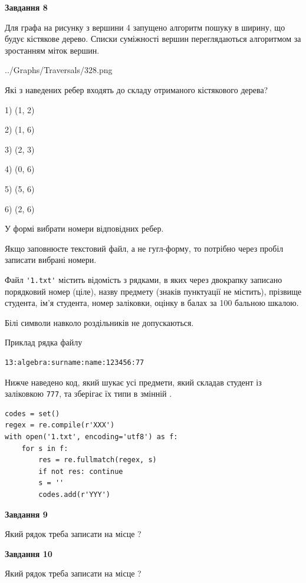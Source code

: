 \documentclass[12pt, ukrainian]{article}
\def\code#1{\Verb!#1!}
\begin{document}
{\begin {large}
{\begin {center}\textbf{Завдання 8}\end {center}}\par
Для графа на рисунку з вершини 4 запущено алгоритм пошуку в ширину, що будує кістякове дерево. Списки суміжності вершин переглядаються алгоритмом за зростанням міток вершин.\par
\begin{center}
	{../Graphs/Traversals/328.png}
\end{center}
\par Які з наведених ребер входять до складу отриманого кістякового дерева?\par
1) (1, 2)\par
2) (1, 6)\par
3) (2, 3)\par
4) (0, 6)\par
5) (5, 6)\par
6) (2, 6)\par
{\vskip 15pt} У формі вибрати номери відповідних ребер.


Якщо заповнюєте текстовий файл, а не гугл-форму, то потрібно через пробіл записа\-ти вибрані номери.\par
\newpage


Файл \code{'1.txt'} містить відомість з рядками, в яких через двокрапку записано поряд\-ковий номер (ціле), назву предмету (знаків пунктуації не містить), прізвище студента, ім'я студента, номер заліковки, оцінку в балах за 100 бальною шкалою.

Білі символи навколо роздільників не допускаються.

Приклад рядка файлу



\begin{verbatim}
13:algebra:surname:name:123456:77
\end{verbatim}


Нижче наведено код, який шукає усі предмети, який складав студент із заліковкою \code{777}, та зберігає їх типи в змінній .



\begin{verbatim}
codes = set()
regex = re.compile(r'XXX')
with open('1.txt', encoding='utf8') as f:
    for s in f:
        res = re.fullmatch(regex, s)
        if not res: continue
        s = ''
        codes.add(r'YYY')
\end{verbatim}


{\begin {center}\textbf{Завдання 9}\end {center}}\par
Який рядок треба записати на місце  ?\par
\vspace{5mm}


{\begin {center}\textbf{Завдання 10}\end {center}}\par
Який рядок треба записати на місце  ?\par


\newpage


\end {large}}
\end{document}
